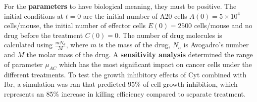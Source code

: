 For the \textbf{parameters} to have biological meaning, they must be positive. The initial conditions at $t=0$ are the initial number of A20 cells $A(0) = 5 \times 10^4$ cells/mouse, the initial number of effector cells $E(0) = 2500$ cells/mouse and no drug before the treatment $C(0)=0$. The number of drug molecules is calculated using $\frac{mN_a}{M}$, where $m$ is the mass of the drug, $N_a$ is Avogadro's number and $M$ the molar mass of the drug.
A \textbf{sensitivity analysis} determined the range of parameter $\mu_{AC}$ which has the most significant impact on cancer cells under the different treatments. To test the growth inhibitory effects of Cyt combined with Ibr, a simulation was ran that predicted 95\% of cell growth inhibition, which represents an 85\% increase in killing efficiency compared to separate treatment.
